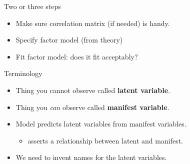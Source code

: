 \documentclass[ignorenonframetext,]{beamer}
\providecommand{\tightlist}{%
  \setlength{\itemsep}{0pt}\setlength{\parskip}{0pt}}
\begin{document}
\begin{frame}{Two or three steps}
\protect\hypertarget{two-or-three-steps}{}

\begin{itemize}
\item
  Make sure correlation matrix (if needed) is handy.
\item
  Specify factor model (from theory)
\item
  Fit factor model: does it fit acceptably?
\end{itemize}

\end{frame}

\begin{frame}{Terminology}
\protect\hypertarget{terminology}{}

\begin{itemize}
\item
  Thing you cannot observe called \textbf{latent variable}.
\item
  Thing you \emph{can} observe called \textbf{manifest variable}.
\item
  Model predicts latent variables from manifest variables.

  \begin{itemize}
  \tightlist
  \item
    asserts a relationship between latent and manifest.
  \end{itemize}
\item
  We need to invent names for the latent variables.
\end{itemize}

\end{frame}
\end{document}
